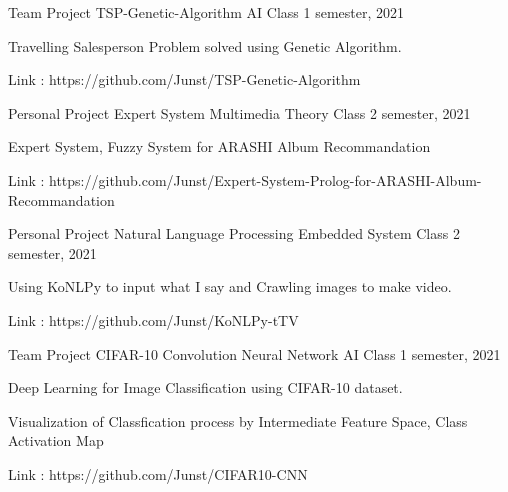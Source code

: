 

\begin{cventries}

  \cventry
    {Team Project} %
    {TSP-Genetic-Algorithm} %
    {AI Class} %
    {1 semester, 2021} %
    {
      \begin{cvitems} %
        \item {Travelling Salesperson Problem solved using Genetic Algorithm.}
        \item {Link : https://github.com/Junst/TSP-Genetic-Algorithm }
      \end{cvitems}
    }
    
  \cventry
    {Personal Project} %
    {Expert System} %
    {Multimedia Theory Class} %
    {2 semester, 2021} %
    {
      \begin{cvitems} %
        \item {Expert System, Fuzzy System for ARASHI Album Recommandation}
        \item {Link : https://github.com/Junst/Expert-System-Prolog-for-ARASHI-Album-Recommandation }
      \end{cvitems}
    }
    
  \cventry
    {Personal Project} %
    {Natural Language Processing} %
    {Embedded System Class} %
    {2 semester, 2021} %
    {
      \begin{cvitems} %
        \item {Using KoNLPy to input what I say and Crawling images to make video.}
        \item {Link : https://github.com/Junst/KoNLPy-tTV }
      \end{cvitems}
    }
    
  \cventry
    {Team Project} %
    {CIFAR-10 Convolution Neural Network} %
    {AI Class} %
    {1 semester, 2021} %
    {
      \begin{cvitems} %
        \item {Deep Learning for Image Classification using CIFAR-10 dataset.}
        \item {Visualization of Classfication process by Intermediate Feature Space, Class Activation Map}
        \item {Link : https://github.com/Junst/CIFAR10-CNN }
      \end{cvitems}
    }
            

\end{cventries}
